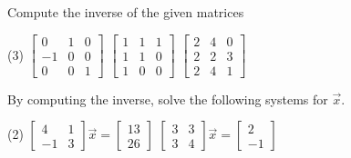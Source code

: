 \begin{exercise}\ansMark%
Compute the inverse of the given matrices
\begin{tasks}(3)
\task
$\begin{bmatrix}
0 & 1 & 0 \\
-1 & 0 & 0 \\
0 & 0 & 1
\end{bmatrix}$
\task
$\begin{bmatrix}
1 & 1 & 1 \\
1 & 1 & 0 \\
1 & 0 & 0
\end{bmatrix}$
\task
$\begin{bmatrix}
2 & 4 & 0 \\
2 & 2 & 3 \\
2 & 4 & 1
\end{bmatrix}$
\end{tasks}
\end{exercise}

\begin{exercise}
By computing the inverse,
solve the following systems for $\vec{x}$.
\begin{tasks}(2)
\task
$\begin{bmatrix}
4 & 1 \\
-1 & 3
\end{bmatrix} \vec{x} =
\begin{bmatrix} 13 \\ 26 \end{bmatrix}$
\task
$\begin{bmatrix}
3 & 3 \\
3 & 4
\end{bmatrix} \vec{x} =
\begin{bmatrix} 2 \\ -1 \end{bmatrix}$
\end{tasks}
\end{exercise}

